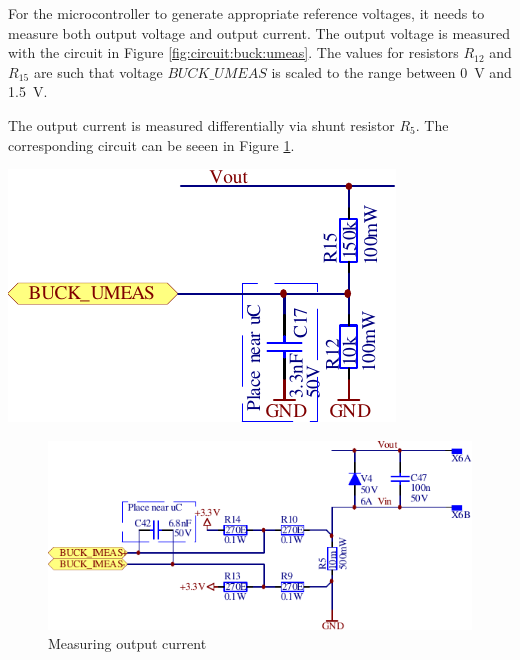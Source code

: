 \begin{minipage}{.50\textwidth}
    For  the  microcontroller  to  generate  appropriate  reference  voltages,
    it  needs  to   measure  both  output  voltage   and  output  current. The
    output    voltage   is    measured    with   the    circuit   in    Figure
    \ref{fig:circuit:buck:umeas}. The  values   for  resistors   $R_{12}$  and
    $R_{15}$  are such  that  voltage  $BUCK\_UMEAS$ is  scaled  to the  range
    between \SI{0}{\volt} and \SI{1.5}{\volt}.

    The  output   current  is  measured  differentially   via  shunt  resistor
    $R_5$. The    corresponding   circuit    can    be    seeen   in    Figure
    \ref{fig:circuit:buck:imeas}.

\end{minipage}
\begin{minipage}{.50\textwidth}
    \center
    \includegraphics[width=.8\textwidth]{images/circuit/buck-umeas.pdf}
    \label{fig:circuit:buck:umeas}
\end{minipage}

\begin{figure}[th!]
    \center
    \includegraphics[width=.85\textwidth]{images/circuit/buck-imeas.pdf}
    \caption{Measuring output current}
    \label{fig:circuit:buck:imeas}
\end{figure}

